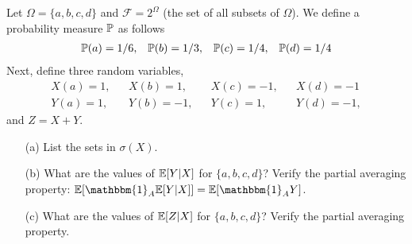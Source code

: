 \documentclass[10pt]{article}
\begin{document}
\maketitle

\begin{problem}[Exercise 2.1]
    Let \( \Omega=\{a,b,c,d\} \) and \( \mathcal{F} = 2^\Omega \) (the set of all subsets of \( \Omega \)). We define a probability measure \( \mathbb{P} \) as follows
    \begin{align*}
        \mathbb{P}(a)=1/6, && \mathbb{P}(b)=1/3, && \mathbb{P}(c)=1/4, && \mathbb{P}(d)=1/4
    \end{align*}
    Next, define three random variables,
    \begin{align*}
        X(a)=1, && X(b)=1, && X(c)=-1, && X(d)=-1\\
        Y(a)=1, && Y(b)=-1, && Y(c)=1, && Y(d)=-1,
    \end{align*}
    and \( Z=X+Y \).
    \begin{enumerate}
        \item[(a)] List the sets in \( \sigma(X) \).
        \item[(b)] What are the values of \( \mathbb{E}[Y|X] \) for \( \{a,b,c,d\} \)? Verify the partial averaging property: \( \EE[\mathbbm{1}_A\EE[Y|X]]=\EE[\mathbbm{1}_A Y] \).
        \item[(c)] What are the values of \( \mathbb{E}[Z|X] \) for \( \{a,b,c,d\} \)? Verify the partial averaging property.
    \end{enumerate}
\end{problem}
\end{document}
